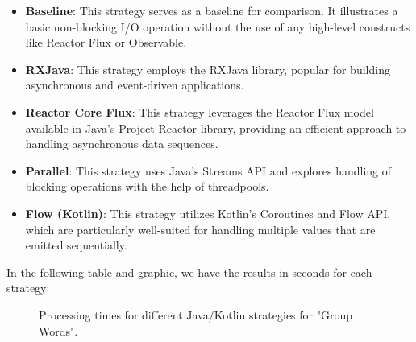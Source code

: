     \begin{itemize}
        \item \textbf{Baseline}: This strategy serves as a baseline for comparison. It illustrates a basic non-blocking I/O operation without the use of any high-level constructs like Reactor Flux or Observable.
        \item \textbf{RXJava}: This strategy employs the RXJava library, popular for building asynchronous and event-driven applications.
        \item \textbf{Reactor Core Flux}: This strategy leverages the Reactor Flux model available in Java's Project Reactor library, providing an efficient approach to handling asynchronous data sequences.
        \item \textbf{Parallel}: This strategy uses Java's Streams API and explores handling of blocking operations with the help of threadpools.
        \item \textbf{Flow (Kotlin)}: This strategy utilizes Kotlin's Coroutines and Flow API, which are particularly well-suited for handling multiple values that are emitted sequentially.
    \end{itemize}

    In the following table and graphic, we have the results in seconds for each strategy:

    \begin{figure}[H]
        \centering
        \caption{Processing times for different Java/Kotlin strategies for "Group Words".}
        \label{fig:group_word_processing_times_java}
    \end{figure}
    

